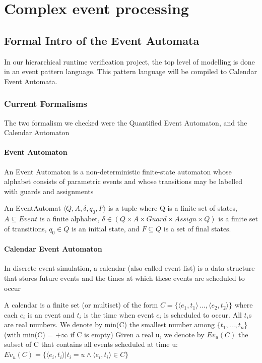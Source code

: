 	\chapter{Complex event processing}
	\label{chap:cep}
	\section{Formal Intro of the Event Automata} %
		In our hierarchical runtime verification project, the top level of modelling is done in an event pattern language.
		This pattern language will be compiled to Calendar Event Automata.
		\subsection{Current Formalisms}
			The two formalism we checked were the Quantified Event Automaton, and the Calendar Automaton
			\subsubsection{Event Automaton}
				An Event Automaton is a non-deterministic finite-state automaton whose alphabet consists
				of parametric events and whose transitions may be labelled with guards and assignments
				
				\begin{dfn}
				An EventAutomat 
				$\langle Q,A,\delta, q_0, F \rangle$ is a tuple where Q is a finite set of states, 
				$A \subseteq Event$ is a finite alphabet,  %
				$\delta \in (Q \times A \times Guard \times Assign \times Q)$ is a finite set of transitions, 
				$q_0 \in Q$ is an initial state, and 
				$F \subseteq Q$ is a set of final states.
				\end{dfn}
				
			\subsubsection{Calendar Event Automaton}
				In discrete event simulation, a calendar (also called event list) is a data structure that
				stores future events and the times at which these events are scheduled to occur
				
				\begin{dfn}
				A calendar is a finite set (or multiset) of the form $C = \{ \langle e_1, t_1\rangle \, \dots ,\langle e_2, t_2\rangle \}$
				where each $e_i$ is an event and $t_i$ is the time when event $e_i$ is scheduled to occur. All $t_i$s are real numbers.
				We denote by min(C) the smallest number among $\{t_1,\dots ,t_n \}$ (with min(C) = $+\infty$ if C is empty)
				Given a real u, we denote by $Ev_u(C)$ the subset of C that contains all events scheduled at time u:
				$Ev_u(C) = \{ \langle e_i, t_i \rangle  | t_i = u \wedge \langle e_i , t_i \rangle \in C \} $
				\end{dfn}
				
